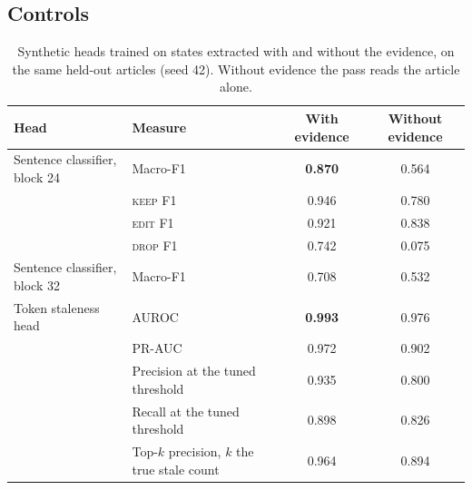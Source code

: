 \documentclass[]{paper}
\newcommand{\keep}{\textsc{keep}}
\newcommand{\edit}{\textsc{edit}}
\newcommand{\drop}{\textsc{drop}}
\begin{document}
\subsection{Controls}

\begin{table}[H]
\caption{Synthetic heads trained on states extracted with and without the evidence, on the same held-out articles (seed 42). Without evidence the pass reads the article alone.}
\label{tab:control_full}
\centering
\footnotesize
\begin{tabular}{llcc}
\toprule
Head & Measure & With evidence & Without evidence \\
\midrule
Sentence classifier, block 24 & Macro-F1 & \textbf{0.870} & 0.564 \\
 & \keep{} F1 & 0.946 & 0.780 \\
 & \edit{} F1 & 0.921 & 0.838 \\
 & \drop{} F1 & 0.742 & 0.075 \\
Sentence classifier, block 32 & Macro-F1 & 0.708 & 0.532 \\
\midrule
Token staleness head & AUROC & \textbf{0.993} & 0.976 \\
 & PR-AUC & 0.972 & 0.902 \\
 & Precision at the tuned threshold & 0.935 & 0.800 \\
 & Recall at the tuned threshold & 0.898 & 0.826 \\
 & Top-$k$ precision, $k$ the true stale count & 0.964 & 0.894 \\
\bottomrule
\end{tabular}
\end{table}
\end{document}
